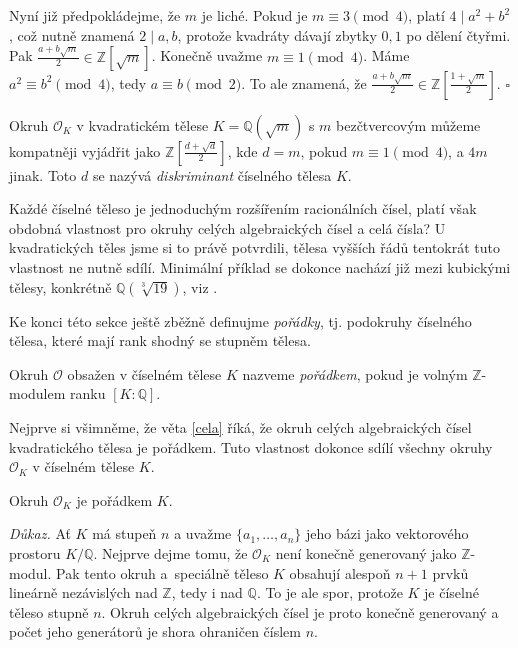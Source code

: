 \documentclass[12pt]{report}
\begin{document}
Nyní již předpokládejme, že $m$ je liché. Pokud je $m \equiv 3 \pmod{4}$, platí $4 \mid a^2 + b^2$, což nutně znamená $2 \mid a,b$, protože kvadráty dávají zbytky $0,1$ po dělení čtyřmi. Pak $\frac{a+b\sqrt{m}}{2} \in \mathbb{Z}[\sqrt{m}]$. Konečně uvažme $m \equiv 1 \pmod{4}$. Máme $a^2 \equiv b^2 \pmod{4}$, tedy $a \equiv b \pmod{2}$. To ale znamená, že $\frac{a+b\sqrt{m}}{2} \in \mathbb{Z}\left[\frac{1+\sqrt{m}}{2}\right]$. \hfill $\square$\\

\begin{poznamka}
Okruh $\mathcal{O}_K$ v kvadratickém tělese $K = \mathbb{Q}(\sqrt{m})$ s $m$ bezčtvercovým můžeme kompatněji vyjádřit jako $\mathbb{Z}\left[\frac{d+\sqrt{d}}{2}\right]$, kde $d = m$, pokud $m \equiv 1 \pmod{4}$, a $4m$ jinak. Toto $d$ se nazývá \textit{diskriminant} číselného tělesa $K$.
\end{poznamka}

Každé číselné těleso je jednoduchým rozšířením racionálních čísel, platí však obdobná vlastnost pro okruhy celých algebraických čísel a celá čísla? U kvadratických těles jsme si to právě potvrdili, tělesa vyšších řádů tentokrát tuto vlastnost ne nutně sdílí. Minimální příklad se dokonce nachází již mezi kubickými tělesy, konkrétně $\mathbb{Q}(\sqrt[3]{19})$, viz \cite[Ex. 2.3.]{Conrad3}.

Ke konci této sekce ještě zběžně definujme \textit{pořádky}, tj. podokruhy číselného tělesa, které mají rank shodný se stupněm tělesa.

\begin{definice}
Okruh $\mathcal{O}$ obsažen v číselném tělese $K$ nazveme \textit{pořádkem}, pokud je volným $\mathbb{Z}$-modulem ranku $[K:\mathbb{Q}]$.
\end{definice}

Nejprve si všimněme, že věta \ref{cela} říká, že okruh celých algebraických čísel kvadratického tělesa je pořádkem. Tuto vlastnost dokonce sdílí všechny okruhy $\mathcal{O}_K$ v číselném tělese $K$.

\begin{veta}
Okruh $\mathcal{O}_K$ je pořádkem $K$.
\end{veta}
\noindent \textit{Důkaz.}  Ať $K$ má stupeň $n$ a uvažme $\lbrace a_1, \dots, a_n \rbrace$ jeho bázi jako vektorového prostoru $K/\mathbb{Q}$. Nejprve dejme tomu, že $\mathcal{O}_K$ není konečně generovaný jako $\mathbb{Z}$-modul. Pak tento okruh a~speciálně těleso $K$ obsahují alespoň $n+1$ prvků lineárně nezávislých nad $\mathbb{Z}$, tedy i nad $\mathbb{Q}$. To je ale spor, protože $K$ je číselné těleso stupně $n$. Okruh celých algebraických čísel je proto konečně generovaný a počet jeho generátorů je shora ohraničen číslem $n$.
\end{document}
